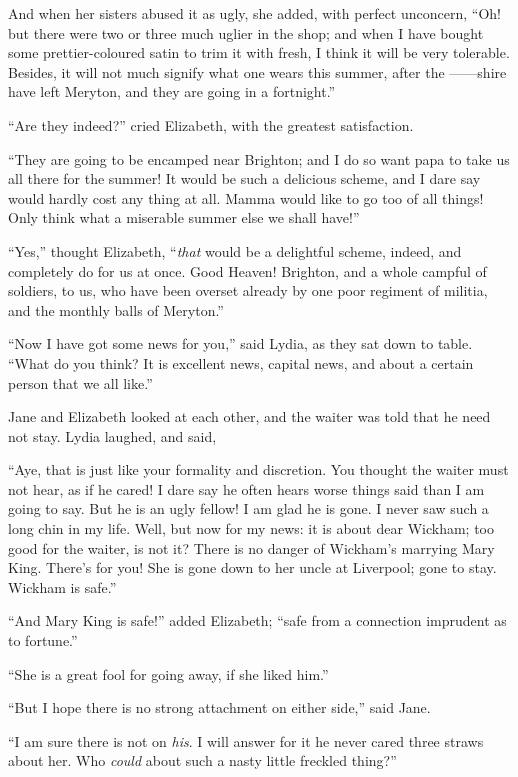 And when her sisters abused it as ugly, she added,
with perfect unconcern, “Oh! but there were two or
three much uglier in the shop; and when I have bought
some prettier-coloured satin to trim it with fresh, I think
it will be very tolerable. Besides, it will not much signify
what one wears this summer, after the \hbox{------shire} have
left Meryton, and they are going in a fortnight.”

“Are they indeed?” cried Elizabeth, with the greatest
satisfaction.

“They are going to be encamped near Brighton; and
I do so want papa to take us all there for the summer!
It would be such a delicious scheme, and I dare say
would hardly cost any thing at all. Mamma would like
to go too of all things! Only think what a miserable
summer else we shall have!”

“Yes,” thought Elizabeth, “\textit{that} would be a delightful
sch\-eme, indeed, and completely do for us at once.
Good Heaven! Brighton, and a whole campful of soldiers,
to us, who have been overset already by one poor regiment
of militia, and the monthly balls of Meryton.”

“Now I have got some news for you,” said Lydia, as
they sat down to table. “What do you think? It is
excellent news, capital news, and about a certain person
that we all like.”

Jane and Elizabeth looked at each other, and the
waiter was told that he need not stay. Lydia laughed,
and said,

“Aye, that is just like your formality and discretion.
You thought the waiter must not hear, as if he cared!
I dare say he often hears worse things said than I am
going to say. But he is an ugly fellow! I am glad he is
gone. I never saw such a long chin in my life. Well, but
now for my news: it is about dear Wickham; too good
for the waiter, is not it? There is no danger of Wickham’s
marrying Mary King. There’s for you! She is gone down
to her uncle at Liverpool; gone to stay. Wickham is
safe.”

“And Mary King is safe!” added Elizabeth; “safe
from a connection imprudent as to fortune.”

“She is a great fool for going away, if she liked him.”

“But I hope there is no strong attachment on either
side,” said Jane.

“I am sure there is not on \textit{his}. I will answer for it
he never cared three straws about her. Who \textit{could} about
such a nasty little freckled thing?”

